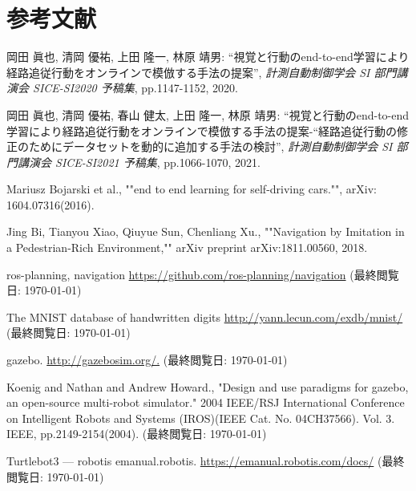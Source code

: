 \chapter*{参考文献}

岡田 眞也, 清岡 優祐, 上田 隆一, 林原 靖男: ``視覚と行動のend-to-end学習により経路追従行動をオンラインで模倣する手法の提案'', \textit{計測自動制御学会 SI 部門講演会 SICE-SI2020 予稿集}, pp.1147-1152, 2020.

岡田 眞也, 清岡 優祐, 春山 健太, 上田 隆一, 林原 靖男: ``視覚と行動のend-to-end学習により経路追従行動をオンラインで模倣する手法の提案-“経路追従行動の修正のためにデータセットを動的に追加する手法の検討'', \textit{計測自動制御学会 SI 部門講演会 SICE-SI2021 予稿集}, pp.1066-1070, 2021.

Mariusz Bojarski et al., ""end to end learning for self-driving cars."", arXiv: 1604.07316(2016). 

Jing Bi, Tianyou Xiao, Qiuyue Sun, Chenliang Xu., ""Navigation by Imitation in a Pedestrian-Rich Environment,"" arXiv preprint arXiv:1811.00560, 2018.

ros-planning, navigation
\url{https://github.com/ros-planning/navigation}
(最終閲覧日: \today)

The MNIST database of handwritten digits
\url{http://yann.lecun.com/exdb/mnist/}
(最終閲覧日: \today)

gazebo.
\url{http://gazebosim.org/.}
(最終閲覧日: \today)

Koenig and Nathan and Andrew Howard., "Design and use paradigms for gazebo, an open-source multi-robot simulator." 2004 IEEE/RSJ International Conference on Intelligent Robots and Systems (IROS)(IEEE Cat. No. 04CH37566). Vol. 3. IEEE, pp.2149-2154(2004).
(最終閲覧日: \today)

Turtlebot3 — robotis emanual.robotis.
\url{https://emanual.robotis.com/docs/}
(最終閲覧日: \today)
